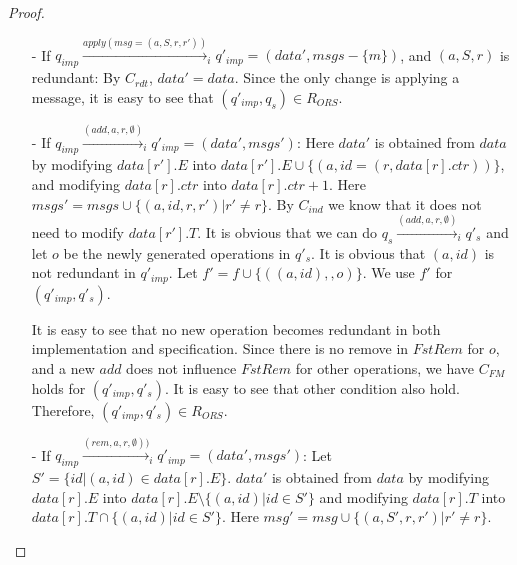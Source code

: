 \begin {proof}
\begin{itemize}
    Since forgetting does not change visibility for the remanning operations, it is easy to see that $C_{\mathit{FM}}$ and $C_{\mathit{vis}}$ hold for $(q'_{\mathit{imp}},q'_s)$. It is obvious that $C_{\mathit{ind}}$ still holds for $(q'_{\mathit{imp}},q'_s)$. Therefore, $(q'_{\mathit{imp}},q'_s) \in R_{\mathit{ORS}}$.

\item[-] If $q_{\mathit{imp}} \xrightarrow{\mathit{apply}( \mathit{msg}=(a,S,r,r' ))}_i q'_{\mathit{imp}} = (\mathit{data}',\mathit{msgs} - \{ m \})$, and $(a,S,r)$ is redundant: By $C_{\mathit{rdt}}$, $\mathit{data}' = \mathit{data}$. Since the only change is applying a message, it is easy to see that $(q'_{\mathit{imp}},q_s) \in R_{\mathit{ORS}}$.

\item[-] If $q_{\mathit{imp}} \xrightarrow{(\mathit{add},a,r,\emptyset)}_i q'_{\mathit{imp}} = (\mathit{data}',\mathit{msgs}')$: Here $\mathit{data}'$ is obtained from $\mathit{data}$ by modifying $\mathit{data}[r'].E$ into $\mathit{data}[r'].E \cup \{ (a,\mathit{id} = (r,\mathit{data}[r].\mathit{ctr})) \}$, and modifying $\mathit{data}[r].\mathit{ctr}$ into $\mathit{data}[r].\mathit{ctr}+1$. Here $\mathit{msgs}' = \mathit{msgs} \cup \{ (a,\mathit{id},r,r') \vert r' \neq r \}$. By $C_{\mathit{ind}}$ we know that it does not need to modify $\mathit{data}[r'].T$. It is obvious that we can do $q_s \xrightarrow{( \mathit{add},a,r,\emptyset )}_i q'_s$ and let $o$ be the newly generated operations in $q'_s$. It is obvious that $(a,\mathit{id})$ is not redundant in $q'_{\mathit{imp}}$. Let $f' = f \cup \{ ((a,id),,o) \}$. We use $f'$ for $(q'_{\mathit{imp}},q'_s)$.

    It is easy to see that no new operation becomes redundant in both implementation and specification. Since there is no remove in $\mathit{FstRem}$ for $o$, and a new $\mathit{add}$ does not influence $\mathit{FstRem}$ for other operations, we have $C_{\mathit{FM}}$ holds for $(q'_{\mathit{imp}},q'_s)$. It is easy to see that other condition also hold. Therefore, $(q'_{\mathit{imp}},q'_s) \in R_{\mathit{ORS}}$. 

\item[-] If $q_{\mathit{imp}} \xrightarrow{( \mathit{rem},a,r,\emptyset ))}_i q'_{\mathit{imp}} = (\mathit{data}',\mathit{msgs}')$: Let $S' = \{ \mathit{id} \vert (a,\mathit{id}) \in \mathit{data}[r].E \}$. $\mathit{data}'$ is obtained from $\mathit{data}$ by modifying $\mathit{data}[r].E$ into $\mathit{data}[r].E \setminus \{ (a,\mathit{id}) \vert \mathit{id} \in S'\}$ and modifying $\mathit{data}[r].T$ into $\mathit{data}[r].T \cap \{ (a,\mathit{id}) \vert \mathit{id} \in S'\}$. Here $\mathit{msg}' = \mathit{msg} \cup \{ (a,S',r,r') \vert r' \neq r \}$.


\end{itemize}
\end{proof}
